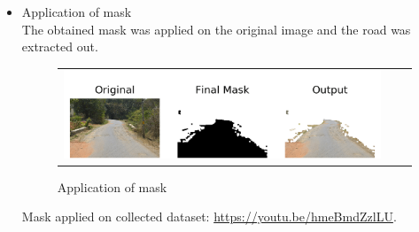 \documentclass[12pt,a4paper]{article}
\begin{document}
\begin{itemize}
\begin{figure}[!ht]
\begin{center}
\end{center}
\end{figure} 

\newpage

\item Application of mask \\

    The obtained mask was applied on the original image and the road was extracted out. 

\begin{figure}[!ht]
\begin{center}

\begin{tabular}{ccc}
\centering
\includegraphics[width = 5in]{images/output.png}
\end{tabular}
\caption{Application of mask}

\end{center}
\end{figure} 

    Mask applied on collected dataset: \url{https://youtu.be/hmeBmdZzlLU}.

    
% 
 
\newpage     
 

\end{itemize}
\end{document}
